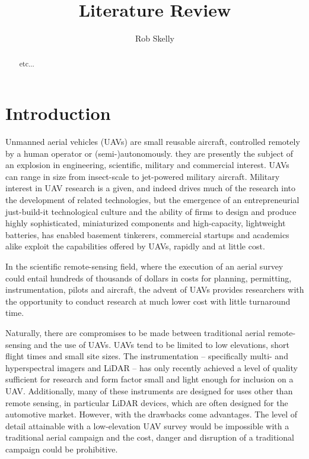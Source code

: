 \documentclass[10pt]{article}
\author{Rob Skelly}
\title{Literature Review}
\begin{document}
\maketitle

\begin{abstract}
etc...
\end{abstract}

\section{Introduction}

Unmanned aerial vehicles (UAVs) are small reusable aircraft, controlled remotely by a human operator or (semi-)autonomously. they are presently the subject of an explosion in engineering, scientific, military and commercial interest. UAVs can range in size from insect-scale to jet-powered military aircraft. Military interest in UAV research is a given, and indeed drives much of the research into the development of related technologies, but the emergence of an entrepreneurial just-build-it technological culture and the ability of firms to design and produce highly sophisticated, miniaturized components and high-capacity, lightweight batteries, has enabled basement tinkerers, commercial startups and academics alike exploit the capabilities offered by UAVs, rapidly and at little cost.

In the scientific remote-sensing field, where the execution of an aerial survey could entail hundreds of thousands of dollars in costs for planning, permitting, instrumentation, pilots and aircraft, the advent of UAVs provides researchers with the opportunity to conduct research at much lower cost with little turnaround time. 

Naturally, there are compromises to be made between traditional aerial remote-sensing and the use of UAVs. UAVs tend to be limited to low elevations, short flight times and small site sizes. The instrumentation -- specifically multi- and hyperspectral imagers and LiDAR -- has only recently achieved a level of quality sufficient for research and form factor small and light enough for inclusion on a UAV. Additionally, many of these instruments are designed for uses other than remote sensing, in particular LiDAR devices, which are often designed for the automotive market. However, with the drawbacks come advantages. The level of detail attainable with a low-elevation UAV survey would be impossible with a traditional aerial campaign and the cost, danger and disruption of a traditional campaign could be prohibitive.
\end{document}
